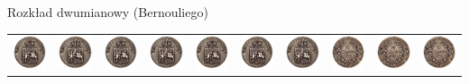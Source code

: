 \documentclass{mp}
\begin{document}
\begin{frame}{Rozkład dwumianowy (Bernouliego)}
\tabcolsep=0cm
\begin{tabular}{cccccccccc}
\includegraphics[width=.1\textwidth]{head.jpg} &
\includegraphics[width=.1\textwidth]{head.jpg} &
\includegraphics[width=.1\textwidth]{head.jpg} &
\includegraphics[width=.1\textwidth]{head.jpg} &
\includegraphics[width=.1\textwidth]{head.jpg} &
\includegraphics[width=.1\textwidth]{head.jpg} &
\includegraphics[width=.1\textwidth]{head.jpg} &
\includegraphics[width=.1\textwidth]{tail.jpg} &
\includegraphics[width=.1\textwidth]{tail.jpg} &
\includegraphics[width=.1\textwidth]{tail.jpg} \\

\end{tabular}
\end{frame}
\end{document}
